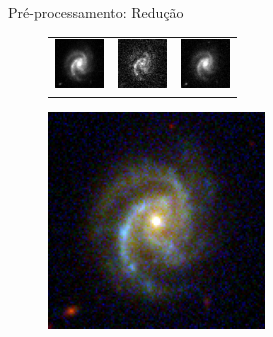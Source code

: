 \documentclass[10pt,xcolor=svgnames]{beamer}
\begin{document}
\begin{frame}{Pré-processamento: Redução}
\begin{minipage}{0.48\textwidth}
\begin{figure}
\begin{tabular}{ccc}
        \includegraphics[width=13mm]{imgs/R.png}    &
        \includegraphics[width=13mm]{imgs/U.png}    &
        \includegraphics[width=13mm]{imgs/Z.png}
      \end{tabular}
    \end{figure}
  \end{minipage}\hfill
  \begin{minipage}{0.38\textwidth}
    \begin{figure}
      \includegraphics[width=\linewidth]{imgs/color.png}
    \end{figure}
  \end{minipage}
\end{frame}
\end{document}
